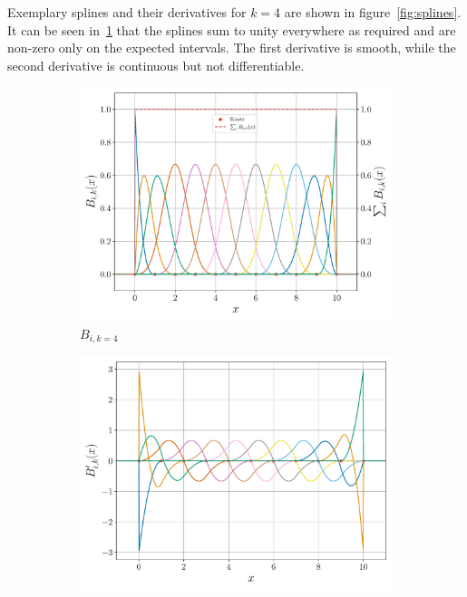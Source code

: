 \documentclass[a4paper,DIV=12,english]{scrartcl}
\begin{document}
Exemplary splines and their derivatives for $k=4$ are shown in figure~\ref{fig:splines}. It can be seen in~\ref{subfig:bik} that the splines sum to unity everywhere as required and are non-zero only on the expected intervals. The first derivative is smooth, while the second derivative is continuous but not differentiable.
\begin{figure}
    \centering
    \begin{subfigure}{0.49\textwidth}
        \centering
        \includegraphics[width=\textwidth]{../plots/B_i_k/B_i.pdf}
        \caption{$B_{i, k=4}$}
        \label{subfig:bik}
    \end{subfigure}
    \begin{subfigure}{0.49\textwidth}
        \centering
        \includegraphics[width=\textwidth]{../plots/B_i_k_x/B_i_x.pdf}

\end{subfigure}
\end{figure}
\end{document}
